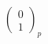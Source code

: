\documentclass[preview]{standalone}
\begin{document}
\begin{align*}
\begin{pmatrix}0\\ 1\end{pmatrix}_p
\end{align*}
\end{document}
